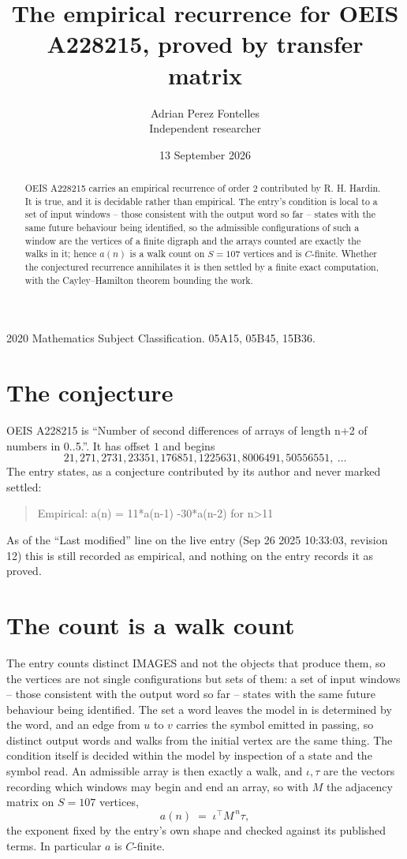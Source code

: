 \documentclass[11pt,a4paper]{article}
\title{The empirical recurrence for OEIS A228215, proved by transfer matrix}
\author{Adrian Perez Fontelles\\ \small Independent researcher}
\date{13 September 2026}
\theoremstyle{plain}
\theoremstyle{definition}
\begin{document}
\maketitle

\begin{abstract}
OEIS A228215 carries an empirical recurrence of order $2$ contributed by R. H. Hardin. It is
true, and it is decidable rather than empirical. The entry's condition is local to a set of input windows -- those consistent with the output word so far -- states with the same future behaviour being identified, so
the admissible configurations of such a window are the vertices of a finite digraph and the
arrays counted are exactly the walks in it; hence $a(n)$ is a walk count on $S=107$ vertices
and is $C$-finite. Whether the conjectured recurrence annihilates it is then settled by a
finite exact computation, with the Cayley--Hamilton theorem bounding the work.
\end{abstract}

\noindent\small 2020 Mathematics Subject Classification. 05A15, 05B45, 15B36.\normalsize

\section{The conjecture}

OEIS A228215 is ``Number of second differences of arrays of length n+2 of numbers in 0..5.''. It has offset $1$ and begins
\[
21, 271, 2731, 23351, 176851, 1225631, 8006491, 50556551,\ \dots
\]
The entry states, as a conjecture contributed by its author and never marked settled:
\begin{quote}
Empirical: a(n) = 11*a(n-1) -30*a(n-2) for n>11
\end{quote}
As of the ``Last modified'' line on the live entry (Sep 26 2025 10:33:03, revision 12) this is still
recorded as empirical, and nothing on the entry records it as proved.

\section{The count is a walk count}

The entry counts distinct IMAGES and not the objects that produce them, so the vertices are not single configurations but sets of them: a set of input windows -- those consistent with the output word so far -- states with the same future behaviour being identified. The set a word leaves the model in is determined by the word, and an edge from $u$ to $v$ carries the symbol emitted in passing, so distinct output words and walks from the initial vertex are the same thing. The condition itself is decided within the model by inspection of a state and the symbol read.
An admissible array is then exactly a walk, and $\iota,\tau$ are the vectors recording which windows may begin and end an array, so with $M$ the adjacency matrix on $S=107$ vertices,
\[
a(n)\;=\;\iota^{\!\top}M^{\,n}\tau ,
\]
the exponent fixed by the entry's own shape and checked against its published terms. In
particular $a$ is $C$-finite.
\end{document}

